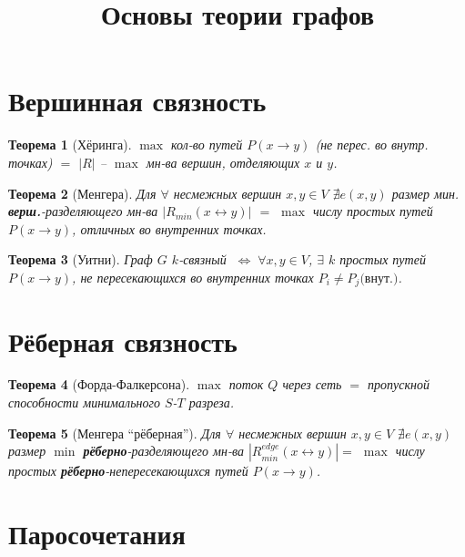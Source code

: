 \documentclass[a4paper,12pt]{article}
\title{Основы теории графов}
\author{}
\date{}
\begin{document}
\newtheorem{theorem}{Теорема}
\def\ilet{$\gimel$}
\def\iiff{$\;\Longleftrightarrow\;$}
\maketitle

\section{Вершинная связность}

\begin{theorem}[Хёринга]
	$\max$ кол-во путей $P(x \rightarrow y)$ (не перес. во внутр. точках) $=$ $|R|$ -- $\max$ мн-ва вершин, отделяющих $x$ и $y$.
\end{theorem}

\begin{theorem}[Менгера]
	Для $\forall$ несмежных вершин $x,y \in V$ $\nexists e(x,y)$ размер мин. \textbf{верш.}-разделяющего мн-ва $|R_{min}(x \leftrightarrow y)|$ $=$ $\max$ числу простых путей $P(x \rightarrow y)$, отличных во внутренних точках.
\end{theorem}

\begin{theorem}[Уитни]
	Граф $G$ $k$-связный \iiff $\forall x,y \in V$, $\exists$ $k$ простых путей $P(x \rightarrow y)$, не пересекающихся во внутренних точках $P_i \neq P_j \text{(внут.)}$.
\end{theorem}

\section{Рёберная связность}

\begin{theorem}[Форда-Фалкерсона]
$\max$ поток $Q$ через сеть $=$ пропускной способности минимального $S$-$T$ разреза.
\end{theorem}

\begin{theorem}[Менгера ``рёберная'']
Для $\forall$ несмежных вершин $x,y \in V$ $\nexists e(x,y)$ размер $\min$ \textbf{рёберно}-разделяющего мн-ва $|R^{edge}_{min}(x \leftrightarrow y)|=$ $\max$ числу простых \textbf{рёберно}-непересекающихся путей $P(x \rightarrow y)$.
\end{theorem}

\section{Паросочетания}
\end{document}

